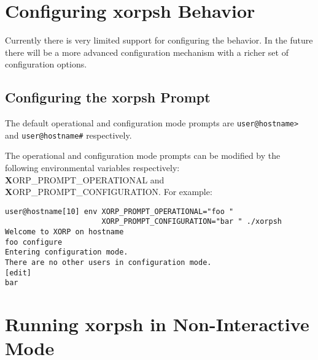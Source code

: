 \noindent{}
\vspace{0.1in}

\section{Configuring xorpsh Behavior}
\label{xorpsh:configuring-xorpsh-behavior}

Currently there is very limited support for configuring the \xorpsh
behavior. In the future there will be a more advanced configuration
mechanism with a richer set of configuration options.

\subsection{Configuring the xorpsh Prompt}

The default operational and configuration mode prompts are
\verb=user@hostname>= and \verb=user@hostname#= respectively.

The operational and configuration mode prompts can be modified by the
following environmental variables respectively:
{\textbf XORP\_PROMPT\_OPERATIONAL} and
{\textbf XORP\_PROMPT\_CONFIGURATION}. For example:

\begin{verbatim}
user@hostname[10] env XORP_PROMPT_OPERATIONAL="foo " 
                      XORP_PROMPT_CONFIGURATION="bar " ./xorpsh
Welcome to XORP on hostname
foo configure
Entering configuration mode.
There are no other users in configuration mode.
[edit]
bar 
\end{verbatim}

\section{Running xorpsh in Non-Interactive Mode}
\label{xorpsh:non-interactive-mode}

